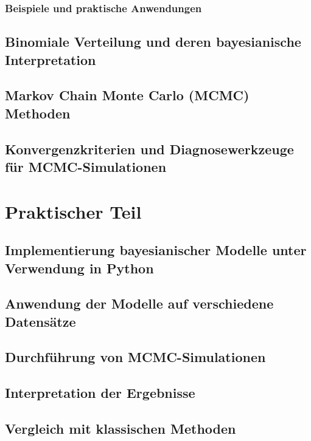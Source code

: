 \documentclass[a4paper,12pt]{article}
\begin{document}
\subsubsection{Beispiele und praktische Anwendungen}

\newpage

\subsection{Binomiale Verteilung und deren bayesianische Interpretation}
\newpage

\subsection{Markov Chain Monte Carlo (MCMC) Methoden}
\newpage

\subsection{Konvergenzkriterien und Diagnosewerkzeuge für MCMC-Simulationen}
\newpage

\section{Praktischer Teil}

\subsection{Implementierung bayesianischer Modelle unter Verwendung in Python}
\newpage

\subsection{Anwendung der Modelle auf verschiedene Datensätze}
\newpage

\subsection{Durchführung von MCMC-Simulationen}
\newpage

\subsection{Interpretation der Ergebnisse}
\newpage

\subsection{Vergleich mit klassischen Methoden}
\newpage
\end{document}

